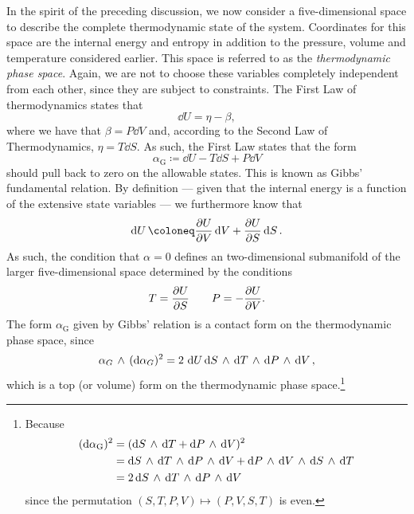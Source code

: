 In the spirit of the preceding discussion, we now consider a five-dimensional space to describe the complete thermodynamic state of the system. Coordinates for this space are the internal energy and entropy in addition to the pressure, volume and temperature considered earlier. This space is referred to as the \emph{thermodynamic phase space}. Again, we are not to choose these variables completely independent from each other, since they are subject to constraints. The First Law of thermodynamics states that
$$ \dd{U} = \eta - \beta, $$
where we have that $ \beta = P\dd{V} $ and, according to the Second Law of Thermodynamics, $\eta = T\dd{S}$. As such, the First Law states that the form
\begin{equation} 
    \alpha_\text{G} \coloneq \dd{U} - T\dd{S} + P\dd{V}
    \label{eq:gibbs_relation}
\end{equation}
should pull back to zero on the allowable states. This is known as Gibbs' fundamental relation. By definition --- given that the internal energy is a function of the extensive state variables ---  we furthermore know that
$$ \dd{U} \coloneq \pdv{U}{V}\dd{V} + \pdv{U}{S}\dd{S}.$$
As such, the condition that $\alpha = 0$ defines an two-dimensional submanifold of the larger five-dimensional space determined by the conditions
\begin{equation}
    T = \pdv{U}{S} \qquad P = -\pdv{U}{V}. 
\end{equation}
The form $\alpha_\text{G}$ given by Gibbs' relation is a contact form on the thermodynamic phase space, since
$$  \alpha_G\,\wedge\,(\dd{\alpha_G})^2  = 2\,\dd{U}  \dd{S}\,\wedge\,\dd{T} \,\wedge\, \dd{P}\,\wedge\,\dd{V}  , $$
which is a top (or volume) form on the thermodynamic phase space.\footnote
{
    Because 
    \begin{equation*} 
        \begin{split}
            (\dd{\alpha_\text{G}})^2 &= ( \dd{S}\,\wedge\,\dd{T}  +  \dd{P}\,\wedge\,\dd{V} )^2 \\
                            &=   \dd{S}\,\wedge\,\dd{T} \,\wedge\, \dd{P}\,\wedge\,\dd{V}   +   \dd{P}\,\wedge\,\dd{V} \,\wedge\, \dd{S}\,\wedge\,\dd{T}   \\
                            &= 2  \dd{S}\,\wedge\,\dd{T} \,\wedge\, \dd{P}\,\wedge\,\dd{V}   \\
        \end{split}
    \end{equation*}
    since the permutation $ (S, T, P, V) \mapsto (P, V, S, T) $ is even.
}

